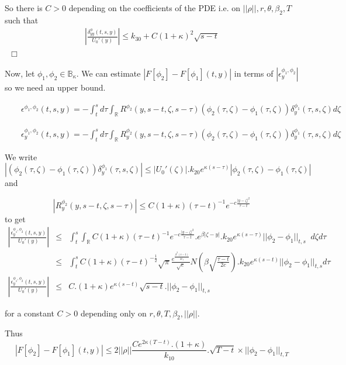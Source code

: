 \documentclass[11pt, psfig]{article}
\theoremstyle{definition}
\theoremstyle{remark}
\numberwithin{equation}{section}
\def\sR{\mathbb{R}}
\def\sR{\mathbb{R}}
\def \ep{\hbox{ }\hfill$\Box$}
\begin{document}
So there is $C>0$  depending on the coefficients of the PDE i.e. on $||\rho||, r, \theta, \beta_2, T$  such that 
\begin{eqnarray*}
|\frac{\delta_{yy}^{\phi}(t,s,y)}{U_0'(y)}|\leq  k_{30}+C(1+\kappa)^2 \sqrt{s-t}
\end{eqnarray*}
\ep


Now, let $\phi_1,\phi_2\in \mathbb{B}_{\kappa}$. 
We can estimate $|F[\phi_2]-F[\phi_1](t,y)|$ in terms of $|\epsilon_y^{\phi_1,\phi_2}|$ so we need an upper bound.



\begin{eqnarray*}
&& \epsilon^{\phi_1,\phi_2}(t,s,y) = - \int_t^{s} d\tau \int_{\sR}  R^{\phi_{2}}(y, s-t,\zeta,s-\tau)(\phi_{2}(\tau,\zeta)-\phi_{1}(\tau,\zeta)) \delta_y^{\phi_1}(\tau,s,\zeta) d\zeta
\end{eqnarray*}

\begin{eqnarray*}
&& \epsilon_y^{\phi_1,\phi_2}(t,s,y) = - \int_t^{s} d\tau \int_{\sR}  R_y^{\phi_{2}}(y,s-t,\zeta, s-\tau)(\phi_{2}(\tau,\zeta)-\phi_{1}(\tau,\zeta)) \delta_y^{\phi_1}(\tau,s,\zeta) d\zeta
\end{eqnarray*}

We write
$$ |(\phi_{2}(\tau,\zeta)-\phi_{1}(\tau,\zeta)) \delta_y^{\phi_1}(\tau,s,\zeta)| \leq |U_0'(\zeta)| . k_{20}e^{\kappa (s-\tau)}   |\phi_{2}(\tau,\zeta)-\phi_{1}(\tau,\zeta)|
$$
and 

$$ |R_y^{\phi_{2}}(y,s-t,\zeta,s-\tau)|\leq  C(1+\kappa) (\tau-t)^{-1} e^{-c \frac{|y-\zeta|^2}{\tau-t}} $$ to get
\begin{eqnarray*}
 |\frac{\epsilon_y^{\phi_1,\phi_2}(t,s,y)}{U_0'(y)}| &\leq & \int_t^{s} \int_{\sR}  C (1+\kappa) (\tau-t)^{-1} e^{-c \frac{|y-\zeta|^2}{\tau-t}} . e^{\beta |\zeta-y|} .  k_{20}e^{\kappa (s-\tau)} ||\phi_{2}-\phi_{1}||_{t,s}  \;\; d\zeta d\tau \\
& \leq & \int_t^s C(1+\kappa) (\tau-t)^{-\frac{1}{2}}\sqrt{ \pi} \frac{ e^{\frac{\beta^2(\tau-t) }{4c_1}}}{\sqrt{c}} N(\beta \sqrt{\frac{\tau-t}{2c}})  .k_{20}e^{\kappa(s-t)} ||\phi_{2}-\phi_{1}||_{t,s} d\tau \\
|\frac{\epsilon_y^{\phi_1,\phi_2}(t,s,y)}{U_0'(y)}|&\leq & C .(1+\kappa)e^{\kappa(s-t)}  \sqrt{s-t} .  ||\phi_{2}-\phi_{1}||_{t,s}
\end{eqnarray*}

for a constant $C>0$ depending only on $r, \theta, T, \beta_2, ||\rho||$.


Thus
$$  |F[\phi_2]-F[\phi_1](t,y)| \leq 2||\rho|| \frac{C e^{2\kappa (T-t)}  . (1+\kappa) }{k_{10}} . \sqrt{T-t} \times  ||\phi_{2}-\phi_{1}||_{t,T}
$$
\end{document}
